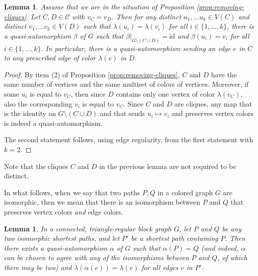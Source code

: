 \documentclass[a4paper, 11pt]{amsart}
\numberwithin{theorem}{section}
\newtheorem{lemma}[theorem]{Lemma}
\newcommand{\cC}{\mathcal{C}}
\begin{document}
\begin{lemma}\label{lemma:local-q-a}
    Assume that we are in the situation of Proposition
    \ref{prop:removing-cliques}. Let $C,D \in \cC$ with $v_C=v_D$.
    Then for any distinct $u_1,\dots u_k\in V(C)$ and distinct
    $v_1,\dots v_k\in V(D)$ such that $\lambda(u_i) = \lambda(v_i)$ for all
    $i\in \lbrace 1,\dots ,k\rbrace$, there is a
    quasi-automorphism $\beta$ of $G$ such that
    $\beta\vert_{G\setminus (C\cup D)} = \text{id}$ and $\beta(u_i) =
    v_i$ for all $i\in \lbrace 1,\dots ,k\rbrace$. In particular,
    there is a quasi-automorphism sending an edge $e$ in $C$
    to any prescribed edge of color $\lambda(e)$ in 
    $D$.
\end{lemma}
\begin{proof}
    By item (2) of Proposition \ref{prop:removing-cliques}, $C$ and $D$
    have the same number of vertices and the same multiset
    of colors of vertices. Moreover, if some $u_i$ is equal to $v_C$,
    then since $D$ contains only one vertex of color $\lambda(v_C)$,
    also the corresponding $v_i$ is equal to $v_C$. Since $C$ and $D$
    are cliques, any map that is the identity on $G \setminus (C \cup
    D)$ and that sends $u_i \mapsto v_i$
    and preserves vertex colors is indeed a quasi-automorphism. 

    The second statement follows, using edge regularity, from the
    first statement with $k=2$.
\end{proof}

Note that the cliques $C$ and $D$ in the previous lemma are not required to be distinct.

In what follows, when we say that two paths $P,Q$ in a colored graph $G$ are
isomorphic, then we mean that there is an isomorphism between $P$ and
$Q$ that preserves vertex colors {\em and} edge colors. 


\begin{lemma}\label{lemma:moving-paths}
    In a connected, triangle-regular block graph $G$, let $P$ and $Q$ be
    any two isomorphic shortest paths, and let $P'$ be a shortest path
     containing $P$. Then there exists a quasi-automorphism
    $\alpha$ of $G$ such that $\alpha(P) = Q$ (and indeed, $\alpha$ can
    be chosen to agree with any of the isomorphisms between $P$ and $Q$,
    of which there may be two) and $\lambda(\alpha(e)) = \lambda(e)$
    for all edges $e$ in $P'$.
\end{lemma}
\end{document}
